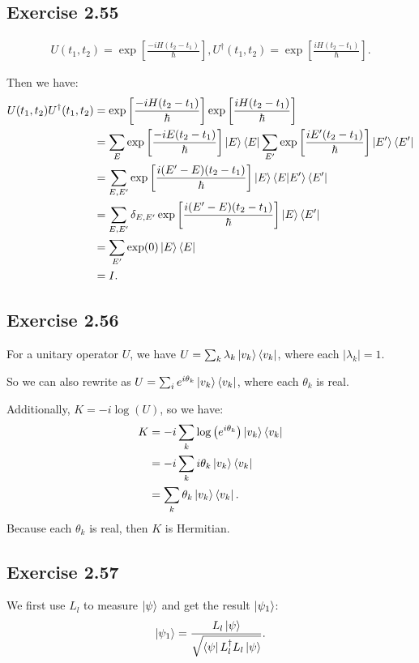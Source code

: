 \subsection*{Exercise 2.55}

\begin{align}
U(t_1,t_2)=\exp \left[\frac{-iH(t_2-t_1)}{\hbar}\right],
U^\dagger(t_1,t_2)=\exp \left[\frac{iH(t_2-t_1)}{\hbar}\right].
\end{align}

Then we have:
\begin{align}
U(t_1,t_2)U^\dagger(t_1,t_2)&=\exp \left[\frac{-iH(t_2-t_1)}{\hbar}\right]\exp \left[\frac{iH(t_2-t_1)}{\hbar}\right]\\
&=\sum_E\exp \left[\frac{-iE(t_2-t_1)}{\hbar}\right]\ket{E}\bra{E}\sum_{E'}\exp \left[\frac{iE'(t_2-t_1)}{\hbar}\right]\ket{E'}\bra{E'}\\
&=\sum_{E,E'}\exp \left[\frac{i(E'-E)(t_2-t_1)}{\hbar}\right]\ket{E}\bra{E}\ket{E'}\bra{E'}\\
&=\sum_{E,E'}\delta_{E,E'}\exp \left[\frac{i(E'-E)(t_2-t_1)}{\hbar}\right]\ket{E}\bra{E'}\\
&=\sum_{E'}\exp(0)\ket{E}\bra{E}\\
&=I
.
\end{align}

\subsection*{Exercise 2.56}

For a unitary operator $U$, we have $U=\sum_k\lambda_k\ket{v_k}\bra{v_k}$, where each $|\lambda_k|=1$.

So we can also rewrite as $U=\sum_i e^{i\theta_k}\ket{v_k}\bra{v_k}$, where each $\theta_k$ is real.

Additionally, $K=-i\log(U)$, so we have:
\begin{align}
K&=-i\sum_k\log\left(e^{i\theta_k}\right)\ket{v_k}\bra{v_k}\\
&=-i\sum_k{i\theta_k}\ket{v_k}\bra{v_k}\\
&=\sum_k{\theta_k}\ket{v_k}\bra{v_k}.
\end{align}
Because each $\theta_k$ is real, then $K$ is Hermitian.

\subsection*{Exercise 2.57}

We first use $L_l$ to measure $\ket{\psi}$ and get the result $\ket{\psi_1}$:
\begin{align}
\ket{\psi_1}=\frac{L_l\ket{\psi}}{\sqrt{\bra{\psi}L_l^\dagger L_l\ket{\psi}}}.
\end{align}

